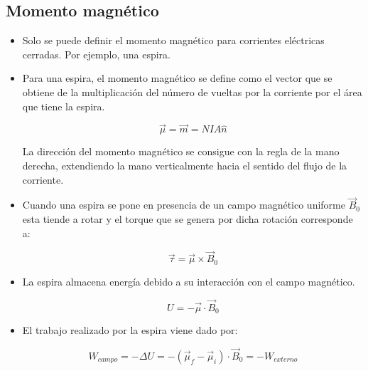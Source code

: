 \documentclass[a4paper,10pt]{article}
\begin{document}

\subsection{Momento magnético}

\begin{itemize}
    
\item Solo se puede definir el momento magnético para corrientes
eléctricas cerradas. Por ejemplo, una espira.

\item Para una espira, el momento magnético se define como el vector
que se obtiene de la multiplicación del número de vueltas por la corriente
por el área que tiene la espira.

\begin{equation*}
    \boxed{
    \vec{\mu}=\vec{m}=NIA\hat{n}
    }
\end{equation*}

La dirección del momento magnético se consigue con la regla de la
mano derecha, extendiendo la mano verticalmente hacia el sentido del flujo
de la corriente.

\item Cuando una espira se pone en presencia de un campo magnético
uniforme $\vec{B}_0$ esta tiende a rotar y el torque que se genera por
dicha rotación corresponde a:

\begin{equation*}
    \boxed{
    \vec{\tau}=\vec{\mu}\times\vec{B}_0
    }
\end{equation*}

\item La espira almacena energía debido a su interacción con el
campo magnético.

\begin{equation*}
    \boxed{
    U=-\vec{\mu}\cdot\vec{B}_0
    }
\end{equation*}

\item El trabajo realizado por la espira viene dado por:

\begin{equation*}
    \boxed{
    W_{campo}=-\Delta U=-\left(\vec{\mu}_f-\vec{\mu}_i\right)\cdot\vec{B}_0
    =-W_{externo}
    }
\end{equation*}

\end{itemize}
\end{document}
